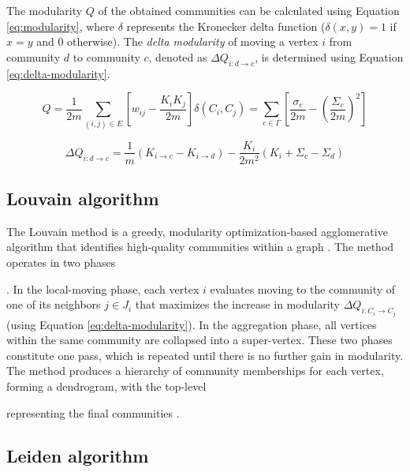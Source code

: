 The modularity $Q$ of the obtained communities can be calculated using Equation \ref{eq:modularity}, where $\delta$ represents the Kronecker delta function ($\delta (x,y)=1$ if $x=y$ and $0$ otherwise). The \textit{delta modularity} of moving a vertex $i$ from community $d$ to community $c$, denoted as $\Delta Q_{i: d \rightarrow c}$, is determined using Equation \ref{eq:delta-modularity}.

\begin{equation}
\label{eq:modularity}
  Q
  = \frac{1}{2m} \sum_{(i, j) \in E} \left[w_{ij} - \frac{K_i K_j}{2m}\right] \delta(C_i, C_j)
  = \sum_{c \in \Gamma} \left[\frac{\sigma_c}{2m} - \left(\frac{\Sigma_c}{2m}\right)^2\right]
\end{equation}

\begin{equation}
\label{eq:delta-modularity}
  \Delta Q_{i: d \rightarrow c}
  = \frac{1}{m} (K_{i \rightarrow c} - K_{i \rightarrow d}) - \frac{K_i}{2m^2} (K_i + \Sigma_c - \Sigma_d)
\end{equation}




\subsection{Louvain algorithm}
\label{sec:about-Louvain}

The Louvain method is a greedy, modularity optimization-based agglomerative algorithm that identifies high-quality communities within a graph \cite{com-lancichinetti09}. The method operates in two phases. In the local-moving phase, each vertex $i$ evaluates moving to the community of one of its neighbors $j \in J_i$ that maximizes the increase in modularity $\Delta Q_{i:C_i \rightarrow C_j}$ (using Equation \ref{eq:delta-modularity}). In the aggregation phase, all vertices within the same community are collapsed into a super-vertex. These two phases constitute one pass, which is repeated until there is no further gain in modularity. The method produces a hierarchy of community memberships for each vertex, forming a dendrogram, with the top-level representing the final communities \cite{com-leskovec21}.




\subsection{Leiden algorithm}
\label{sec:about-leiden}

